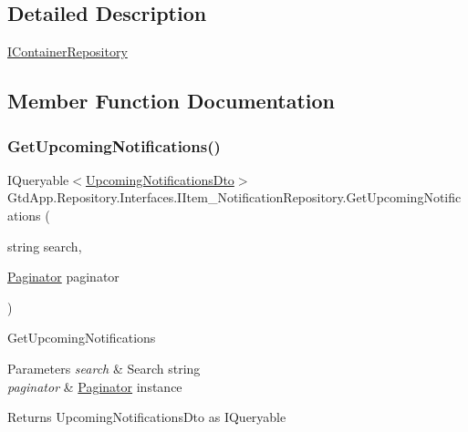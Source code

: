 \subsection{Detailed Description}
\mbox{\hyperlink{interface_gtd_app_1_1_repository_1_1_interfaces_1_1_i_container_repository}{I\+Container\+Repository}} 



\subsection{Member Function Documentation}
\mbox{\label{interface_gtd_app_1_1_repository_1_1_interfaces_1_1_i_item___notification_repository_aabde198f24c18ac864ceb40309f634c8}} 
\subsubsection{\texorpdfstring{Get\+Upcoming\+Notifications()}{GetUpcomingNotifications()}}
{\footnotesize\ttfamily I\+Queryable$<$\mbox{\hyperlink{class_gtd_app_1_1_data_1_1_dto_1_1_upcoming_notifications_dto}{Upcoming\+Notifications\+Dto}}$>$ Gtd\+App.\+Repository.\+Interfaces.\+I\+Item\+\_\+\+Notification\+Repository.\+Get\+Upcoming\+Notifications (\begin{DoxyParamCaption}\item[{string}]{search,  }\item[{\mbox{\hyperlink{class_gtd_app_1_1_repository_1_1_paginator}{Paginator}}}]{paginator }\end{DoxyParamCaption})}



Get\+Upcoming\+Notifications 


\begin{DoxyParams}{Parameters}
{\em search} & Search string\\
\hline
{\em paginator} & \mbox{\hyperlink{class_gtd_app_1_1_repository_1_1_paginator}{Paginator}} instance\\
\hline
\end{DoxyParams}
\begin{DoxyReturn}{Returns}
Upcoming\+Notifications\+Dto as I\+Queryable
\end{DoxyReturn}


